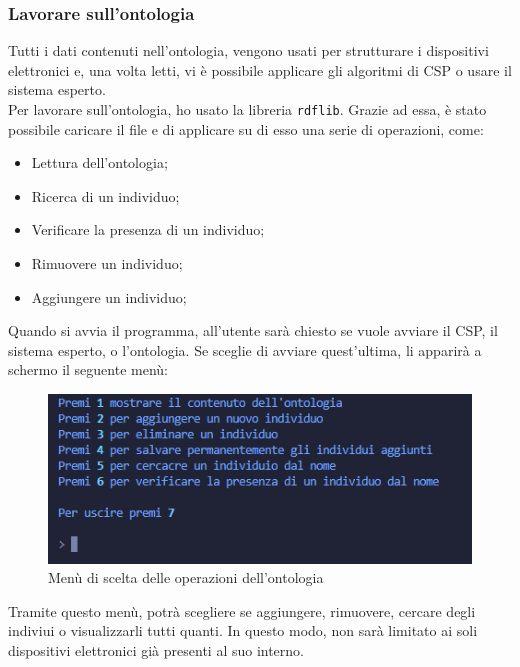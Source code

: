 \documentclass[12pt, letterpaper]{article}
\begin{document}
\subsubsection{Lavorare sull'ontologia}

Tutti i dati contenuti nell'ontologia, vengono usati per strutturare i dispositivi elettronici e, una volta
letti, vi è possibile applicare gli algoritmi di CSP o usare il sistema esperto. \\

\noindent Per lavorare sull'ontologia, ho usato la libreria \texttt{rdflib}. Grazie ad essa, è stato possibile
caricare il file  e di applicare su di esso una serie di operazioni, come:

\begin{itemize}
      \item Lettura dell'ontologia;
      \item Ricerca di un individuo;
      \item Verificare la presenza di un individuo;
      \item Rimuovere un individuo;
      \item Aggiungere un individuo;
\end{itemize}

\noindent Quando si avvia il programma, all'utente sarà chiesto se vuole avviare il CSP, il sistema
esperto, o l'ontologia. Se sceglie di avviare quest'ultima, li apparirà a schermo il seguente menù: \\

\begin{figure}[h]
      \centering
      \includegraphics{ontologia-menu.png}
      \caption{Menù di scelta delle operazioni dell'ontologia}
\end{figure}

\noindent Tramite questo menù, potrà scegliere se aggiungere, rimuovere, cercare degli indiviui o visualizzarli
tutti quanti. In questo modo, non sarà limitato ai soli dispositivi elettronici già presenti al suo interno.
\end{document}
